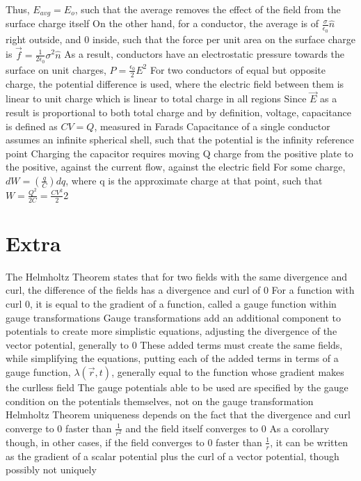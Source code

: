 \documentclass[11 pt, twoside]{article}
\newenvironment{outline*}
{
	\begin{outline}[enumerate]
	}
	{\end{outline}
}
\begin{document}
\begin{outline*}
			\4 Thus, $E_{avg} = E_o$, such that the average removes the effect of the field from the surface charge itself
		\3 On the other hand, for a conductor, the average is of $\frac{\sigma}{\epsilon_0}\hat{n}$ right outside, and 0 inside, such that the force per unit area on the surface charge is $\vec{f} = \frac{1}{2\epsilon_0}\sigma^2\hat{n}$
			\4 As a result, conductors have an electrostatic pressure towards the surface on unit charges, $P = \frac{\epsilon_0}{2}E^2$
	\2 For two conductors of equal but opposite charge, the potential difference is used, where the electric field between them is linear to unit charge which is linear to total charge in all regions
		\3 Since $\vec{E}$ as a result is proportional to both total charge and by definition, voltage, capacitance is defined as $CV = Q$, measured in Farads
		\3 Capacitance of a single conductor assumes an infinite spherical shell, such that the potential is the infinity reference point
		\3 Charging the capacitor requires moving Q charge from the positive plate to the positive, against the current flow, against the electric field
			\4 For some charge, $dW = (\frac{q}{C})dq$, where q is the approximate charge at that point, such that $W = \frac{Q^2}{2C} = \frac{CV^2}{2}$2
\end{outline*}	
\section{Extra}
\begin{outline*}
\1 The Helmholtz Theorem states that for two fields with the same divergence and curl, the difference of the fields has a divergence and curl of 0
	\2 For a function with curl 0, it is equal to the gradient of a function, called a gauge function within gauge transformations
\1 Gauge transformations add an additional component to potentials to create more simplistic equations, adjusting the divergence of the vector potential, generally to 0
	\2 These added terms must create the same fields, while simplifying the equations, putting each of the added terms in terms of a gauge function, $\lambda(\vec{r}, t)$, generally equal to the function whose gradient makes the curlless field
	\2 The gauge potentials able to be used are specified by the gauge condition on the potentials themselves, not on the gauge transformation
\1 Helmholtz Theorem uniqueness depends on the fact that the divergence and curl converge to 0 faster than $\frac{1}{r^2}$ and the field itself converges to 0
	\2 As a corollary though, in other cases, if the field converges to 0 faster than $\frac{1}{r}$, it can be written as the gradient of a scalar potential plus the curl of a vector potential, though possibly not uniquely
\end{outline*}
\end{document}
